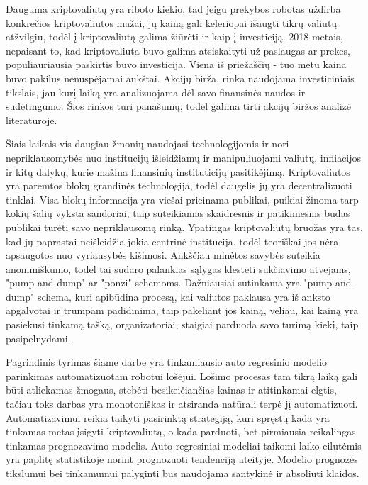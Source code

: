 \documentclass{VUMIFInfKursinis}
\begin{document}
Dauguma kriptovaliutų yra riboto kiekio, tad jeigu prekybos robotas uždirba konkrečios kriptovaliutos mažai, jų kainą gali keleriopai išaugti 
tikrų valiutų atžvilgiu, todėl į kriptovaliutą galima žiūrėti ir kaip į investiciją. 2018 metais, nepaisant to, kad kriptovaliuta buvo galima 
atsiskaityti už paslaugas ar prekes, populiauriausia paskirtis buvo investicija. Viena iš priežaščių - tuo metu kaina buvo pakilus nenuspėjamai
aukštai\cite{garg2018autoregressive}. Akcijų birža, rinka naudojama investiciniais tikslais, jau kurį laiką yra analizuojama dėl savo finansinės
naudos ir sudėtingumo. Šios rinkos turi panašumų, todėl galima tirti akcijų biržos analizė literatūroje.

Šiais laikais vis daugiau žmonių naudojasi technologijomis ir nori nepriklausomybės nuo institucijų išleidžiamų ir manipuliuojami valiutų, infliacijos ir kitų dalykų, 
kurie mažina finansinių instituticijų pasitikėjimą. Kriptovaliutos yra paremtos blokų grandinės technologija, todėl daugelis jų yra decentralizuoti tinklai. 
Visa blokų informacija yra viešai prieinama publikai, puikiai žinoma tarp kokių šalių vyksta sandoriai, taip suteikiamas skaidresnis ir patikimesnis būdas publikai
turėti savo nepriklausomą rinką. Ypatingas kriptovaliutų bruožas yra tas, kad jų paprastai neišleidžia jokia centrinė institucija, todėl teoriškai jos nėra 
apsaugotos nuo vyriausybės kišimosi. Ankščiau minėtos savybės suteikia anonimiškumo, todėl tai sudaro palankias sąlygas klestėti sukčiavimo atvejams, 
"pump-and-dump" ar "ponzi" schemoms. Dažniausiai sutinkama yra "pump-and-dump" schema, kuri apibūdina procesą, kai valiutos paklausa yra iš anksto
apgalvotai ir trumpam padidinima, taip pakeliant jos kainą, vėliau, kai kainą yra pasiekusi tinkamą tašką, organizatoriai, staigiai parduoda savo
turimą kiekį, taip pasipelnydami\cite{xu2019anatomy}.

Pagrindinis tyrimas šiame darbe yra tinkamiausio auto regresinio modelio parinkimas automatizuotam robotui lošėjui. Lošimo procesas tam tikrą laiką gali būti atliekamas žmogaus, 
stebėti besikeičiančias kainas ir atitinkamai elgtis, tačiau toks darbas yra monotoniškas ir atsiranda natūrali terpė jį automatizuoti. Automatizavimui
reikia taikyti pasirinktą strategiją, kuri spręstų kada yra tinkamas metas įsigyti kriptovaliutą, o kada parduoti, bet pirmiausia reikalingas tinkamas prognozavimo modelis.
Auto regresiniai modeliai taikomi laiko eilutėmis yra paplitę statistikoje norint prognozuoti tendenciją ateityje. Modelio prognozės tikslumui bei tinkamumui palyginti 
bus naudojama santykinė ir absoliuti klaidos.
\end{document}
